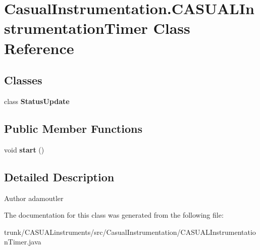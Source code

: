 \hypertarget{class_casual_instrumentation_1_1_c_a_s_u_a_l_instrumentation_timer}{\section{Casual\-Instrumentation.\-C\-A\-S\-U\-A\-L\-Instrumentation\-Timer Class Reference}
\label{class_casual_instrumentation_1_1_c_a_s_u_a_l_instrumentation_timer}
}
\subsection*{Classes}
\begin{DoxyCompactItemize}
\item 
class {\bfseries Status\-Update}
\end{DoxyCompactItemize}
\subsection*{Public Member Functions}
\begin{DoxyCompactItemize}
\item 
\hypertarget{class_casual_instrumentation_1_1_c_a_s_u_a_l_instrumentation_timer_ac89ab4befbe9647a1f8ffd5bee7fbafc}{void {\bfseries start} ()}\label{class_casual_instrumentation_1_1_c_a_s_u_a_l_instrumentation_timer_ac89ab4befbe9647a1f8ffd5bee7fbafc}

\end{DoxyCompactItemize}


\subsection{Detailed Description}
\begin{DoxyAuthor}{Author}
adamoutler 
\end{DoxyAuthor}


The documentation for this class was generated from the following file\-:\begin{DoxyCompactItemize}
\item 
trunk/\-C\-A\-S\-U\-A\-Linstruments/src/\-Casual\-Instrumentation/C\-A\-S\-U\-A\-L\-Instrumentation\-Timer.\-java\end{DoxyCompactItemize}
